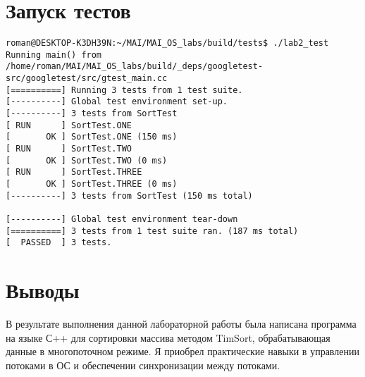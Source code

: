 \documentclass[a4paper, 12pt]{article}
\begin{document}
\newpage
\section{Запуск тестов}
\begin{verbatim}
roman@DESKTOP-K3DH39N:~/MAI/MAI_OS_labs/build/tests$ ./lab2_test 
Running main() from /home/roman/MAI/MAI_OS_labs/build/_deps/googletest-src/googletest/src/gtest_main.cc
[==========] Running 3 tests from 1 test suite.
[----------] Global test environment set-up.
[----------] 3 tests from SortTest
[ RUN      ] SortTest.ONE
[       OK ] SortTest.ONE (150 ms)
[ RUN      ] SortTest.TWO
[       OK ] SortTest.TWO (0 ms)
[ RUN      ] SortTest.THREE
[       OK ] SortTest.THREE (0 ms)
[----------] 3 tests from SortTest (150 ms total)

[----------] Global test environment tear-down
[==========] 3 tests from 1 test suite ran. (187 ms total)
[  PASSED  ] 3 tests.
\end{verbatim}
\newpage
\section{Выводы}
В результате выполнения данной лабораторной работы была написана программа на языке С++ для сортировки массива методом TimSort, обрабатывающая данные в многопоточном режиме. Я приобрел практические навыки в управлении потоками в ОС и обеспечении синхронизации между потоками.
\end{document}
